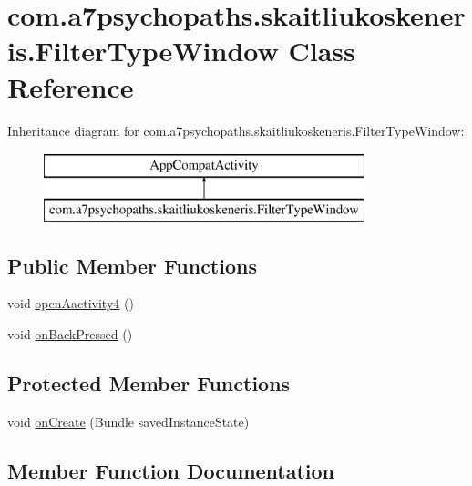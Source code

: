 \hypertarget{classcom_1_1a7psychopaths_1_1skaitliukoskeneris_1_1_filter_type_window}{}\section{com.\+a7psychopaths.\+skaitliukoskeneris.\+Filter\+Type\+Window Class Reference}
\label{classcom_1_1a7psychopaths_1_1skaitliukoskeneris_1_1_filter_type_window}
Inheritance diagram for com.\+a7psychopaths.\+skaitliukoskeneris.\+Filter\+Type\+Window\+:\begin{figure}[H]
\begin{center}
\leavevmode
\includegraphics[height=2.000000cm]{classcom_1_1a7psychopaths_1_1skaitliukoskeneris_1_1_filter_type_window}
\end{center}
\end{figure}
\subsection*{Public Member Functions}
\begin{DoxyCompactItemize}
\item 
void \mbox{\hyperlink{classcom_1_1a7psychopaths_1_1skaitliukoskeneris_1_1_filter_type_window_a94490d46b463408319b90c6fa46e5c68}{open\+Aactivity4}} ()
\item 
void \mbox{\hyperlink{classcom_1_1a7psychopaths_1_1skaitliukoskeneris_1_1_filter_type_window_a3b5bb018d7d16501aae8f55d37be5fb1}{on\+Back\+Pressed}} ()
\end{DoxyCompactItemize}
\subsection*{Protected Member Functions}
\begin{DoxyCompactItemize}
\item 
void \mbox{\hyperlink{classcom_1_1a7psychopaths_1_1skaitliukoskeneris_1_1_filter_type_window_a89df8e35ff390e6f9399900e9c5027e1}{on\+Create}} (Bundle saved\+Instance\+State)
\end{DoxyCompactItemize}


\subsection{Member Function Documentation}
\mbox{\label{classcom_1_1a7psychopaths_1_1skaitliukoskeneris_1_1_filter_type_window_a3b5bb018d7d16501aae8f55d37be5fb1}} 
